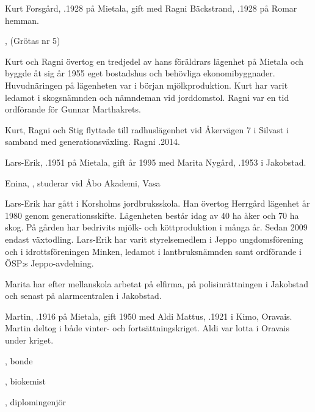 Kurt Forsgård, .1928 på Mietala, gift med Ragni Bäckstrand, .1928 på Romar hemman.
\begin{jhchildren}
  \item {}, (Grötas nr 5)
  \item {}
\end{jhchildren}

Kurt och Ragni övertog en tredjedel av hans föräldrars lägenhet på Mietala och byggde åt sig år 1955 eget bostadshus och behövliga ekonomibyggnader. Huvudnäringen på lägenheten var i början mjölkproduktion. Kurt har varit ledamot i skogsnämnden och nämndeman vid jorddomstol. Ragni var en tid ordförande för Gunnar Marthakrets.

Kurt, Ragni och Stig flyttade till radhuslägenhet vid Åkervägen 7 i Silvast i samband med generationsväxling. Ragni .2014.






Lars-Erik, .1951 på Mietala, gift år 1995 med Marita Nygård, .1953 i Jakobstad.

\begin{jhchildren}
  \item Enina, , studerar vid Åbo Akademi, Vasa
\end{jhchildren}

Lars-Erik har gått i Korsholms jordbruksskola. Han övertog Herrgård	lägenhet år 1980 genom generationsskifte. Lägenheten består idag av 40 ha åker och 70 ha skog. På gården har bedrivits mjölk- och köttproduktion i många år. Sedan 2009 endast växtodling. Lars-Erik har varit styrelsemedlem i Jeppo ungdomsförening och i idrottsföreningen Minken, ledamot i lantbruksnämnden samt ordförande i ÖSP:s Jeppo-avdelning.

Marita har efter mellanskola arbetat på elfirma, på polisinrättningen i Jakobstad och senast på alarmcentralen i Jakobstad.


Martin, .1916 på Mietala, gift 1950 med Aldi  Mattus, .1921 i Kimo, Oravais. Martin deltog i både vinter- och fortsättningskriget. Aldi var lotta i Oravais under kriget.
\begin{jhchildren}
  \item {}, bonde
  \item {}, biokemist
  \item {}, diplomingenjör
\end{jhchildren}

